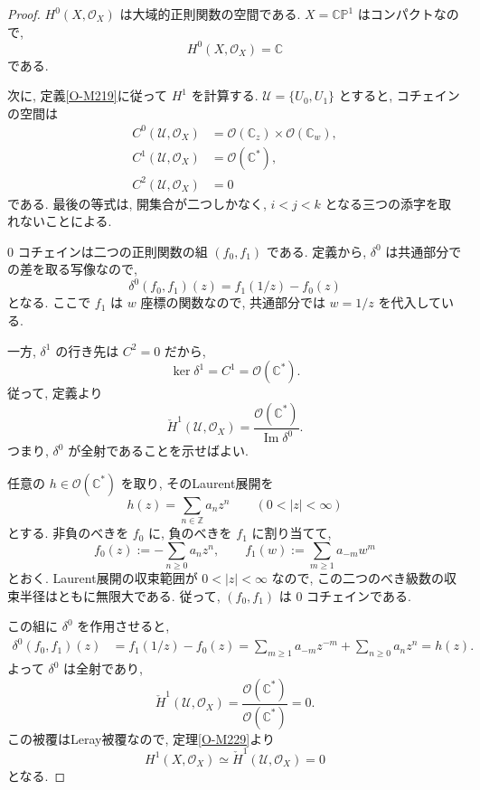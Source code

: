 \documentclass[dvipdfmx,a4paper,11pt]{article} %
\newcommand{\Z}{\mathbb{Z}}
\newcommand{\C}{\mathbb{C}}
\theoremstyle{definition}
\numberwithin{equation}{section}
\begin{document}
\begin{proof}
$H^0(X,\mathcal O_X)$ は大域的正則関数の空間である.
$X=\C\mathbb P^1$ はコンパクトなので,
\[
H^0(X,\mathcal O_X)=\C
\]
である.

次に, 定義\ref{O-M219}に従って $H^1$ を計算する.
$\mathcal U=\{U_0,U_1\}$ とすると,
コチェインの空間は
\[
\begin{aligned}
C^0(\mathcal U,\mathcal O_X)
&=\mathcal O(\C_z)\times\mathcal O(\C_w),\\
C^1(\mathcal U,\mathcal O_X)
&=\mathcal O(\C^*),\\
C^2(\mathcal U,\mathcal O_X)&=0
\end{aligned}
\]
である.
最後の等式は, 開集合が二つしかなく,
$i<j<k$ となる三つの添字を取れないことによる.

$0$ コチェインは二つの正則関数の組 $(f_0,f_1)$ である.
定義から, $\delta^0$ は共通部分での差を取る写像なので,
\[
\delta^0(f_0,f_1)(z)=f_1(1/z)-f_0(z)
\]
となる.
ここで $f_1$ は $w$ 座標の関数なので,
共通部分では $w=1/z$ を代入している.

一方, $\delta^1$ の行き先は $C^2=0$ だから,
\[
\ker\delta^1=C^1=\mathcal O(\C^*).
\]
従って, 定義より
\[
\check H^1(\mathcal U,\mathcal O_X)
=
\frac{\mathcal O(\C^*)}{\operatorname{Im}\delta^0}.
\]
つまり, $\delta^0$ が全射であることを示せばよい.

任意の $h\in\mathcal O(\C^*)$ を取り,
そのLaurent展開を
\[
h(z)=\sum_{n\in\Z}a_nz^n
\qquad(0<|z|<\infty)
\]
とする.
非負のべきを $f_0$ に, 負のべきを $f_1$ に割り当てて,
\[
f_0(z):=-\sum_{n\geq0}a_nz^n,
\qquad
f_1(w):=\sum_{m\geq1}a_{-m}w^m
\]
とおく.
Laurent展開の収束範囲が $0<|z|<\infty$ なので,
この二つのべき級数の収束半径はともに無限大である.
従って, $(f_0,f_1)$ は $0$ コチェインである.

この組に $\delta^0$ を作用させると,
\[
\begin{aligned}
\delta^0(f_0,f_1)(z)
&=f_1(1/z)-f_0(z)
=\sum_{m\geq1}a_{-m}z^{-m}
  +\sum_{n\geq0}a_nz^n
  =h(z).
\end{aligned}
\]
よって $\delta^0$ は全射であり,
\[
\check H^1(\mathcal U,\mathcal O_X)
=\frac{\mathcal O(\C^*)}{\mathcal O(\C^*)}=0.
\]
この被覆はLeray被覆なので, 定理\ref{O-M229}より
\[
H^1(X,\mathcal O_X)
\simeq\check H^1(\mathcal U,\mathcal O_X)=0
\]
となる.
\end{proof}
\end{document}
